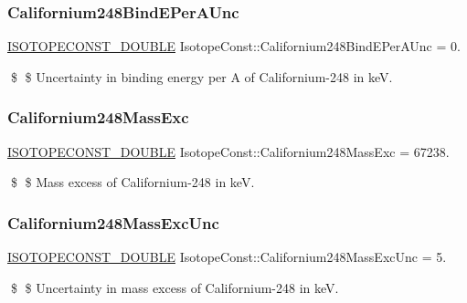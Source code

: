 \subsubsection{\texorpdfstring{Californium248\+Bind\+E\+Per\+A\+Unc}{Californium248BindEPerAUnc}}
{\footnotesize\ttfamily \mbox{\hyperlink{group___isotope_const-_macros_ga8f45a7272ce02c0b4c65c44636ed719a}{I\+S\+O\+T\+O\+P\+E\+C\+O\+N\+S\+T\+\_\+\+D\+O\+U\+B\+LE}} Isotope\+Const\+::\+Californium248\+Bind\+E\+Per\+A\+Unc = 0.}

\$ \$ Uncertainty in binding energy per A of Californium-\/248 in keV. \mbox{\label{group___isotope_const-_californium-_cf248_gabc69e5688f8abd819ab357e6d2614910}} 
\subsubsection{\texorpdfstring{Californium248\+Mass\+Exc}{Californium248MassExc}}
{\footnotesize\ttfamily \mbox{\hyperlink{group___isotope_const-_macros_ga8f45a7272ce02c0b4c65c44636ed719a}{I\+S\+O\+T\+O\+P\+E\+C\+O\+N\+S\+T\+\_\+\+D\+O\+U\+B\+LE}} Isotope\+Const\+::\+Californium248\+Mass\+Exc = 67238.}

\$ \$ Mass excess of Californium-\/248 in keV. \mbox{\label{group___isotope_const-_californium-_cf248_ga1236f933f9aac71416476121cdab71e8}} 
\subsubsection{\texorpdfstring{Californium248\+Mass\+Exc\+Unc}{Californium248MassExcUnc}}
{\footnotesize\ttfamily \mbox{\hyperlink{group___isotope_const-_macros_ga8f45a7272ce02c0b4c65c44636ed719a}{I\+S\+O\+T\+O\+P\+E\+C\+O\+N\+S\+T\+\_\+\+D\+O\+U\+B\+LE}} Isotope\+Const\+::\+Californium248\+Mass\+Exc\+Unc = 5.}

\$ \$ Uncertainty in mass excess of Californium-\/248 in keV. \mbox{\label{group___isotope_const-_californium-_cf248_ga33b64787e9b62720b264f530ac8deaf5}} 

